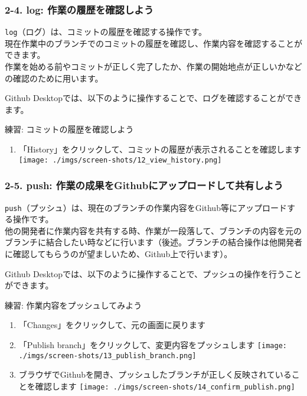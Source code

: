 \subsubsection{2-4. log:
作業の履歴を確認しよう}\label{log-ux4f5cux696dux306eux5c65ux6b74ux3092ux78baux8a8dux3057ux3088ux3046}

\texttt{log}（ログ）は、コミットの履歴を確認する操作です。\\
現在作業中のブランチでのコミットの履歴を確認し、作業内容を確認することができます。\\
作業を始める前やコミットが正しく完了したか、作業の開始地点が正しいかなどの確認のために用います。

Github
Desktopでは、以下のように操作することで、ログを確認することができます。

練習: コミットの履歴を確認しよう

\begin{enumerate}
\def\labelenumi{\arabic{enumi}.}
\tightlist
\item
  「History」をクリックして、コミットの履歴が表示されることを確認します
  \texttt{[image: ./imgs/screen-shots/12\_view\_history.png]}
\end{enumerate}

\subsubsection{2-5. push:
作業の成果をGithubにアップロードして共有しよう}\label{push-ux4f5cux696dux306eux6210ux679cux3092githubux306bux30a2ux30c3ux30d7ux30edux30fcux30c9ux3057ux3066ux5171ux6709ux3057ux3088ux3046}

\texttt{push}（プッシュ）は、現在のブランチの作業内容をGithub等にアップロードする操作です。\\
他の開発者に作業内容を共有する時、作業が一段落して、ブランチの内容を元のブランチに結合したい時などに行います（後述。ブランチの結合操作は他開発者に確認してもらうのが望ましいため、Github上で行います）。

Github
Desktopでは、以下のように操作することで、プッシュの操作を行うことができます。

練習: 作業内容をプッシュしてみよう

\begin{enumerate}
\def\labelenumi{\arabic{enumi}.}
\item
  「Changes」をクリックして、元の画面に戻ります
\item
  「Publish branch」をクリックして、変更内容をプッシュします
  \texttt{[image: ./imgs/screen-shots/13\_publish\_branch.png]}
\item
  ブラウザでGithubを開き、プッシュしたブランチが正しく反映されていることを確認します
  \texttt{[image: ./imgs/screen-shots/14\_confirm\_publish.png]}
\end{enumerate}

